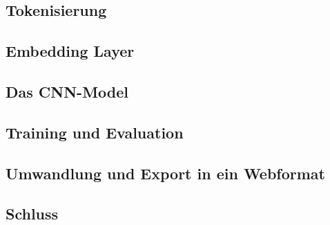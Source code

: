 \subsection{Tokenisierung}
\subsection{Embedding Layer}
\subsection{Das CNN-Model}
\subsection{Training und Evaluation}
\subsection{Umwandlung und Export in ein Webformat}
\subsection{Schluss}